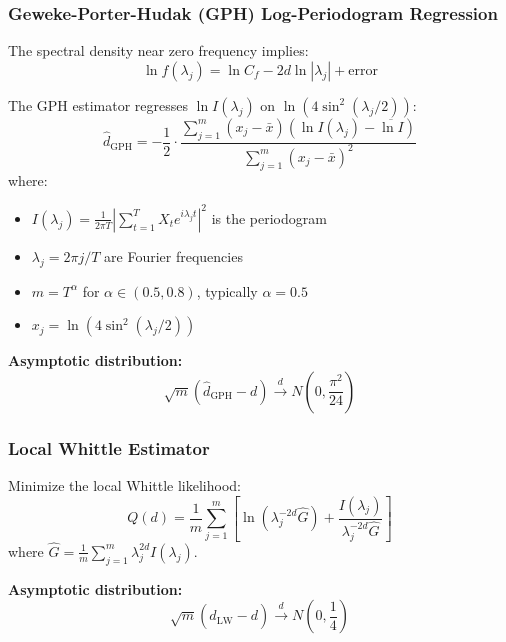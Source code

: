 \documentclass[11pt,a4paper]{article}
\theoremstyle{definition}
\newcommand{\dhat}{\hat{d}}
\begin{document}
\subsubsection{Geweke-Porter-Hudak (GPH) Log-Periodogram Regression}

The spectral density near zero frequency implies:
\begin{equation}
    \ln f(\lambda_j) = \ln C_f - 2d \ln|\lambda_j| + \text{error}
\end{equation}

The GPH estimator regresses $\ln I(\lambda_j)$ on $\ln(4\sin^2(\lambda_j/2))$:
\begin{equation}
    \dhat_{\text{GPH}} = -\frac{1}{2} \cdot \frac{\sum_{j=1}^m (x_j - \bar{x})(\ln I(\lambda_j) - \overline{\ln I})}{\sum_{j=1}^m (x_j - \bar{x})^2}
\end{equation}
where:
\begin{itemize}
    \item $I(\lambda_j) = \frac{1}{2\pi T}\left|\sum_{t=1}^T X_t e^{i\lambda_j t}\right|^2$ is the periodogram
    \item $\lambda_j = 2\pi j/T$ are Fourier frequencies
    \item $m = T^\alpha$ for $\alpha \in (0.5, 0.8)$, typically $\alpha = 0.5$
    \item $x_j = \ln(4\sin^2(\lambda_j/2))$
\end{itemize}

\textbf{Asymptotic distribution:}
\begin{equation}
    \sqrt{m}(\dhat_{\text{GPH}} - d) \xrightarrow{d} N\left(0, \frac{\pi^2}{24}\right)
\end{equation}

\subsubsection{Local Whittle Estimator}

Minimize the local Whittle likelihood:
\begin{equation}
    Q(d) = \frac{1}{m}\sum_{j=1}^m \left[\ln(\lambda_j^{-2d} \hat{G}) + \frac{I(\lambda_j)}{\lambda_j^{-2d}\hat{G}}\right]
\end{equation}
where $\hat{G} = \frac{1}{m}\sum_{j=1}^m \lambda_j^{2d} I(\lambda_j)$.

\textbf{Asymptotic distribution:}
\begin{equation}
    \sqrt{m}(\dhat_{\text{LW}} - d) \xrightarrow{d} N\left(0, \frac{1}{4}\right)
\end{equation}
\end{document}
